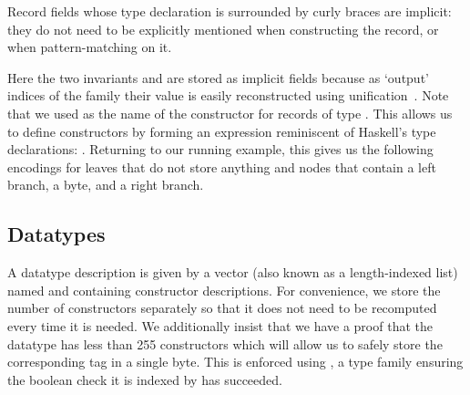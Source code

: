
\begin{remark}
  Record fields whose type declaration is surrounded by
  curly braces are implicit: they do not need to be explicitly
  mentioned when constructing the record, or when pattern-matching
  on it.
\end{remark}

Here the two invariants  and
 are stored as implicit fields
because as `output' indices of the  family
their value is easily reconstructed using
unification~\citep{DBLP:conf/tlca/AbelP11}.
%
Note that we used \IdrisData{(::)} as the name of the
constructor for records of type .
This allows us to define constructors by forming an
expression reminiscent of Haskell's type declarations:
 \IdrisData{::} .
%
Returning to our running example, this gives us the following encodings for
leaves that do not store anything
and nodes that contain a left branch, a byte, and a right branch.

\noindent
\begin{minipage}[t]{.38\textwidth}
\end{minipage}\hfill
\begin{minipage}[t]{.58\textwidth}
\end{minipage}

\subsection{Datatypes}

A datatype description 
is given by a vector (also known as
a length-indexed list) named 
and containing constructor descriptions.
%
For convenience, we store the number 
of constructors separately so that it does not need to be
recomputed every time it is needed.
%
We additionally insist that we have a proof 
that the datatype has less than 255 constructors which will allow us
to safely store the corresponding tag in a single byte.
This is enforced using , a type
family ensuring the boolean check it is indexed by has succeeded.


